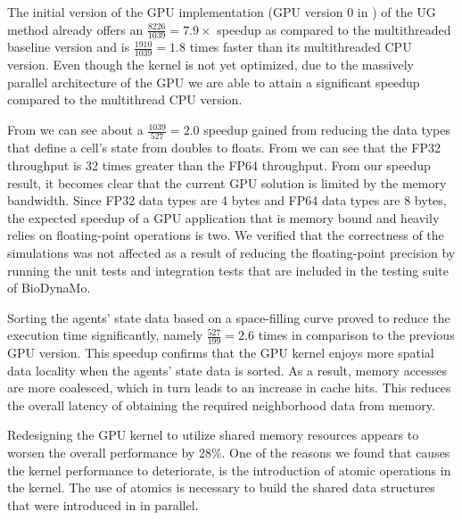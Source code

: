 \documentclass[conference]{IEEEtran}
\begin{document}
\par The initial version of the GPU implementation (GPU version 0 in ) of the UG method already offers an $\frac{8226}{1039} = 7.9\times$ speedup as compared to the multithreaded baseline version and is $\frac{1910}{1039} = 1.8$ times faster than its multithreaded CPU version.
Even though the kernel is not yet optimized, due to the massively parallel architecture of the GPU we are able to attain a significant speedup compared to the multithread CPU version.
\par From  we can see about a $\frac{1039}{527} = 2.0$ speedup gained from reducing the data types that define a cell's state from doubles to floats.
From  we can see that the FP32 throughput is 32 times greater than the FP64 throughput.
From our speedup result, it becomes clear that the current GPU solution is limited by the memory bandwidth.
Since FP32 data types are 4 bytes and FP64 data types are 8 bytes, the expected speedup of a GPU application that is memory bound and heavily relies on floating-point operations is two.
We verified that the correctness of the simulations was not affected as a result of reducing the floating-point precision by running the unit tests and integration tests that are included in the testing suite of BioDynaMo.
\par Sorting the agents' state data based on a space-filling curve proved to reduce the execution time significantly, namely $\frac{527}{199} = 2.6$ times in comparison to the previous GPU version.
This speedup confirms that the GPU kernel enjoys more spatial data locality when the agents' state data is sorted.
As a result, memory accesses are more coalesced, which in turn leads to an increase in cache hits.
This reduces the overall latency of obtaining the required neighborhood data from memory.
\par Redesigning the GPU kernel to utilize shared memory resources appears to worsen the overall performance by $28\%$.
One of the reasons we found that causes the kernel performance to deteriorate, is the introduction of atomic operations in the kernel.
The use of atomics is necessary to build the shared data structures that were introduced in  in parallel.
\end{document}
